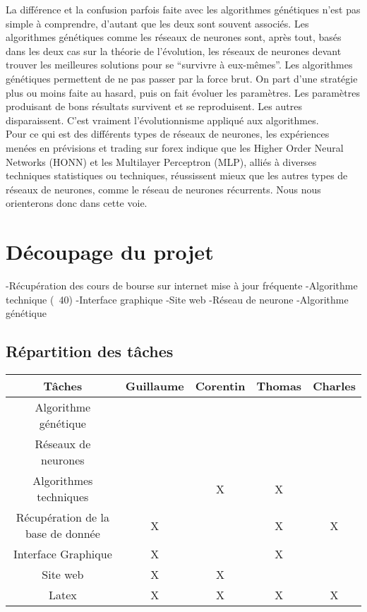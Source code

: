 \documentclass[a4paper,12pt]{article}
\begin{document}
La différence et la confusion parfois faite avec les algorithmes génétiques n’est pas simple à comprendre, d’autant que les deux sont souvent associés. Les algorithmes génétiques comme les réseaux de neurones sont, après tout, basés dans les deux cas sur la théorie de l’évolution, les réseaux de neurones devant trouver les meilleures solutions pour se “survivre à eux-mêmes”. Les algorithmes génétiques permettent de ne pas passer par la force brut. On part d’une stratégie plus ou moins faite au hasard, puis on fait évoluer les paramètres. Les paramètres produisant de bons résultats survivent et se reproduisent. Les autres disparaissent. C’est vraiment l’évolutionnisme appliqué aux algorithmes. \\

Pour ce qui est des différents types de réseaux de neurones, les expériences menées en prévisions et trading sur forex indique que les Higher Order Neural Networks (HONN) et les Multilayer Perceptron (MLP), alliés à diverses techniques statistiques ou techniques, réussissent mieux que les autres types de réseaux de neurones, comme le réseau de neurones récurrents. Nous nous orienterons donc dans cette voie.

\section{Découpage du projet}

-Récupération des cours de bourse sur internet mise à jour fréquente
-Algorithme technique (~40)
-Interface graphique 
-Site web
-Réseau de neurone 
-Algorithme génétique 

\subsection{Répartition des tâches}
\begin{tabular}{|c||c|c|c|c|}
\hline
Tâches & Guillaume & Corentin & Thomas & Charles\\
\hline
Algorithme génétique & & & & \\
\hline
Réseaux de neurones & & & & \\
\hline
Algorithmes techniques & & X & X & \\
\hline
Récupération de la base de donnée & X & & X & X \\
\hline
Interface Graphique & X & & X &\\
\hline
Site web & X & X & &\\
\hline
Latex & X & X & X & X \\
\hline 
\end{tabular}
\end{document}
